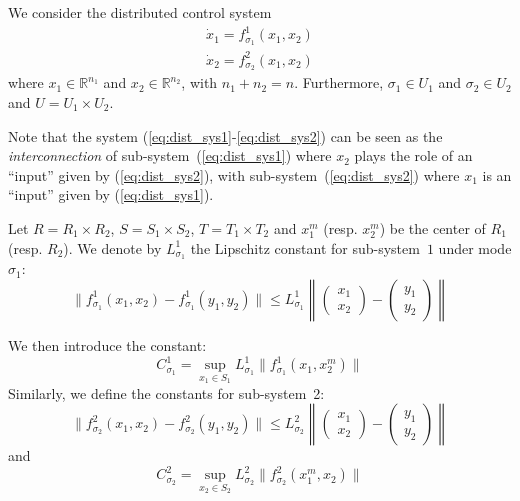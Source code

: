 We consider the distributed control system
\begin{eqnarray}
 \dot x_1 = f_{\sigma_1}^1 (x_1,x_2)
  \label{eq:dist_sys1}\\
 \dot x_2 = f_{\sigma_2}^2 (x_1,x_2)
 \label{eq:dist_sys2}
\end{eqnarray}
where $x_1 \in \mathbb{R}^{n_1}$ and $x_2 \in \mathbb{R}^{n_2}$, with $n_1 + n_2 = n$.
Furthermore, $\sigma_1 \in U_1$ and $\sigma_2 \in U_2$ and $U = U_1 \times U_2$.
%

Note that the system (\ref{eq:dist_sys1}-\ref{eq:dist_sys2}) can be
seen as the {\em interconnection} of sub-system~(\ref{eq:dist_sys1})
where $x_2$ plays the role of an ``input'' given by
(\ref{eq:dist_sys2}), with sub-system~(\ref{eq:dist_sys2}) where $x_1$
is an ``input'' given by (\ref{eq:dist_sys1}).

%
Let $R = R_1 \times R_2$, $S = S_1 \times S_2$, $T = T_1 \times T_2$
and $x_1^m$ (resp. $x_2^m$) be the center of $R_1$ (resp. $R_2$).  We
denote by $L_{\sigma_1}^1$ the Lipschitz constant for sub-system~$1$
under mode $\sigma_1$:
$$ \| f_{\sigma_1}^1 (x_1,x_2) - f_{\sigma_1}^1 (y_1,y_2) \| \leq L_{\sigma_1}^1 \left\| \begin{pmatrix} x_1 \\ x_2 \end{pmatrix} - \begin{pmatrix} y_1 \\ y_2 \end{pmatrix} \right\|$$

We then introduce the constant:
$$ C_{\sigma_1}^1 = \sup_{x_1 \in S_1} L_{\sigma_1}^1 \| f_{\sigma_1}^1(x_1,x_2^m) \|$$
Similarly, we define the constants for sub-system~2:
$$ \| f_{\sigma_2}^2 (x_1,x_2) - f_{\sigma_2}^2 (y_1,y_2) \| \leq L_{\sigma_2}^2 \left\| \begin{pmatrix} x_1 \\ x_2 \end{pmatrix} - \begin{pmatrix} y_1 \\ y_2 \end{pmatrix} \right\|$$
and
$$ C_{\sigma_2}^2 = \sup_{x_2 \in S_2} L_{\sigma_2}^2 \| f_{\sigma_2}^2(x_1^m,x_2) \|$$

%


